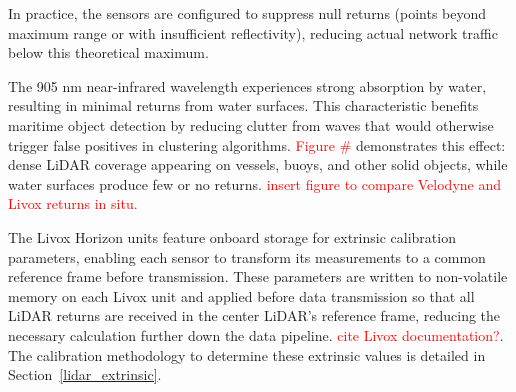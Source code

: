 In practice, the sensors are configured to suppress null returns (points beyond maximum range or with insufficient reflectivity), reducing actual network traffic below this theoretical maximum.

The 905 nm near-infrared wavelength experiences strong absorption by water, resulting in minimal returns from water surfaces.
This characteristic benefits maritime object detection by reducing clutter from waves that would otherwise trigger false positives in clustering algorithms.
\textcolor{red}{Figure \#} demonstrates this effect: dense \ac{LiDAR} coverage appearing on vessels, buoys, and other solid objects, while water surfaces produce few or no returns.
\textcolor{red}{insert figure to compare Velodyne and Livox returns in situ.}








The Livox Horizon units feature onboard storage for extrinsic calibration parameters, enabling each sensor to transform its measurements to a common reference frame before transmission.
These parameters are written to non-volatile memory on each Livox unit and applied before data transmission so that all LiDAR returns are received in the center \ac{LiDAR}'s reference frame, reducing the necessary calculation further down the data pipeline.
\textcolor{red}{cite Livox documentation?}.
The calibration methodology to determine these extrinsic values is detailed in Section~\ref{lidar_extrinsic}.


